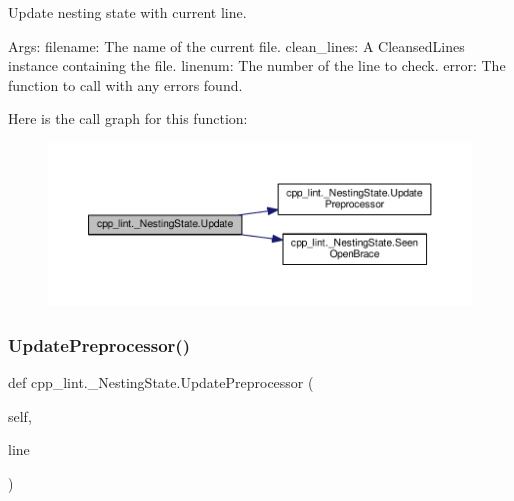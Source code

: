 \begin{DoxyVerb}Update nesting state with current line.

Args:
  filename: The name of the current file.
  clean_lines: A CleansedLines instance containing the file.
  linenum: The number of the line to check.
  error: The function to call with any errors found.
\end{DoxyVerb}
 Here is the call graph for this function\+:
\nopagebreak
\begin{figure}[H]
\begin{center}
\leavevmode
\includegraphics[width=350pt]{classcpp__lint_1_1___nesting_state_a8ffa3f80c9867b44c7c6d28ed88ffe1e_cgraph}
\end{center}
\end{figure}
\mbox{\label{classcpp__lint_1_1___nesting_state_a078812aa9c30a2f75bb93214fa8ee4f2}} 
\subsubsection{\texorpdfstring{Update\+Preprocessor()}{UpdatePreprocessor()}}
{\footnotesize\ttfamily def cpp\+\_\+lint.\+\_\+\+Nesting\+State.\+Update\+Preprocessor (\begin{DoxyParamCaption}\item[{}]{self,  }\item[{}]{line }\end{DoxyParamCaption})}

